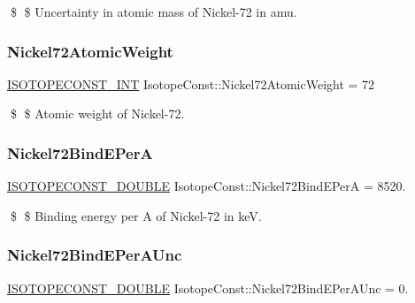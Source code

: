 \$ \$ Uncertainty in atomic mass of Nickel-\/72 in amu. \mbox{\label{group___isotope_const-_nickel-_ni72_ga0cd8171bdd866b11f368395ad9c3042b}} 
\subsubsection{\texorpdfstring{Nickel72\+Atomic\+Weight}{Nickel72AtomicWeight}}
{\footnotesize\ttfamily \mbox{\hyperlink{group___isotope_const-_macros_ga5f18360b3e99483a35c32d789e62621c}{I\+S\+O\+T\+O\+P\+E\+C\+O\+N\+S\+T\+\_\+\+I\+NT}} Isotope\+Const\+::\+Nickel72\+Atomic\+Weight = 72}

\$ \$ Atomic weight of Nickel-\/72. \mbox{\label{group___isotope_const-_nickel-_ni72_gaace6c2704943af0cb514a38183b07f55}} 
\subsubsection{\texorpdfstring{Nickel72\+Bind\+E\+PerA}{Nickel72BindEPerA}}
{\footnotesize\ttfamily \mbox{\hyperlink{group___isotope_const-_macros_ga8f45a7272ce02c0b4c65c44636ed719a}{I\+S\+O\+T\+O\+P\+E\+C\+O\+N\+S\+T\+\_\+\+D\+O\+U\+B\+LE}} Isotope\+Const\+::\+Nickel72\+Bind\+E\+PerA = 8520.}

\$ \$ Binding energy per A of Nickel-\/72 in keV. \mbox{\label{group___isotope_const-_nickel-_ni72_ga55277d080c2e966e1c954a98836eaeb2}} 
\subsubsection{\texorpdfstring{Nickel72\+Bind\+E\+Per\+A\+Unc}{Nickel72BindEPerAUnc}}
{\footnotesize\ttfamily \mbox{\hyperlink{group___isotope_const-_macros_ga8f45a7272ce02c0b4c65c44636ed719a}{I\+S\+O\+T\+O\+P\+E\+C\+O\+N\+S\+T\+\_\+\+D\+O\+U\+B\+LE}} Isotope\+Const\+::\+Nickel72\+Bind\+E\+Per\+A\+Unc = 0.}


